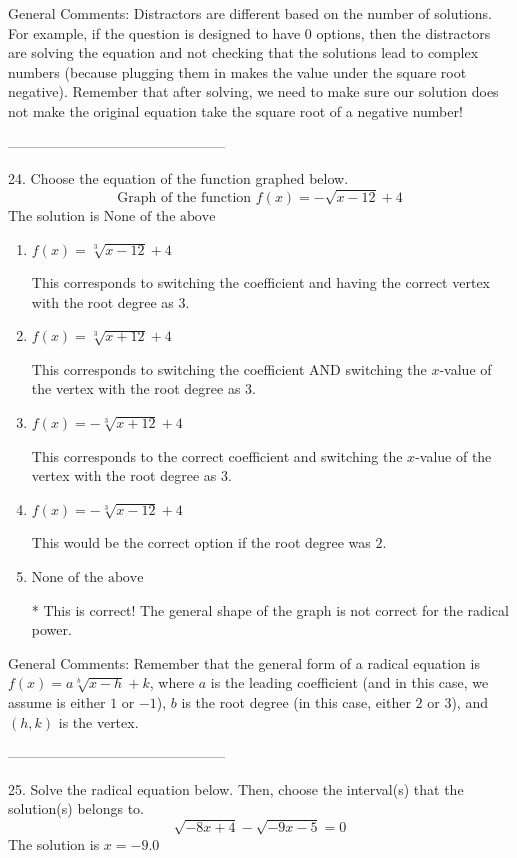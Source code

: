 \documentclass{extbook}[14pt]
\begin{document}
General Comments: Distractors are different based on the number of solutions. For example, if the question is designed to have 0 options, then the distractors are solving the equation and not checking that the solutions lead to complex numbers (because plugging them in makes the value under the square root negative). Remember that after solving, we need to make sure our solution does not make the original equation take the square root of a negative number!

-----------------------------------------------

24. Choose the equation of the function graphed below.
\[ \text{Graph of the function } f(x) = - \sqrt{x - 12} + 4 \] 
The solution is $ \text{None of the above} $ 

\begin{enumerate}[label=\Alph*.] 
\item $ f(x) = \sqrt[3]{x - 12} + 4 $ 

 This corresponds to switching the coefficient and having the correct vertex with the root degree as $3$. 
\item $ f(x) = \sqrt[3]{x + 12} + 4 $ 

 This corresponds to switching the coefficient AND switching the $x$-value of the vertex with the root degree as $3$. 
\item $ f(x) = - \sqrt[3]{x + 12} + 4 $ 

 This corresponds to the correct coefficient and switching the $x$-value of the vertex with the root degree as $3$. 
\item $ f(x) = - \sqrt[3]{x - 12} + 4 $ 

 This would be the correct option if the root degree was $2$. 
\item $ \text{None of the above} $ 

 * This is correct! The general shape of the graph is not correct for the radical power. 
\end{enumerate} 
 
General Comments: Remember that the general form of a radical equation is $ f(x) = a \sqrt[b]{x - h} + k$, where $a$ is the leading coefficient (and in this case, we assume is either $1$ or $-1$), $b$ is the root degree (in this case, either $2$ or $3$), and $(h, k)$ is the vertex.

-----------------------------------------------

25. Solve the radical equation below. Then, choose the interval(s) that the solution(s) belongs to.
\[ \sqrt{-8 x + 4} - \sqrt{-9 x - 5} = 0 \] 
The solution is $ x = -9.0 $ 
\end{document}
